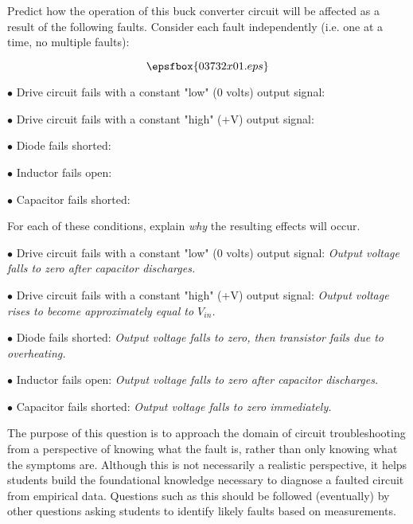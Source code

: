 

Predict how the operation of this buck converter circuit will be affected as a result of the following faults.  Consider each fault independently (i.e. one at a time, no multiple faults):

$$\epsfbox{03732x01.eps}$$

\medskip
\item{$\bullet$} Drive circuit fails with a constant "low" (0 volts) output signal:
\vskip 5pt
\item{$\bullet$} Drive circuit fails with a constant "high" (+V) output signal:
\vskip 5pt
\item{$\bullet$} Diode fails shorted:
\vskip 5pt
\item{$\bullet$} Inductor fails open:
\vskip 5pt
\item{$\bullet$} Capacitor fails shorted:
\medskip

For each of these conditions, explain {\it why} the resulting effects will occur.







\medskip
\item{$\bullet$} Drive circuit fails with a constant "low" (0 volts) output signal: {\it Output voltage falls to zero after capacitor discharges.}
\vskip 5pt
\item{$\bullet$} Drive circuit fails with a constant "high" (+V) output signal: {\it Output voltage rises to become approximately equal to $V_{in}$.}
\vskip 5pt
\item{$\bullet$} Diode fails shorted: {\it Output voltage falls to zero, then transistor fails due to overheating.}
\vskip 5pt
\item{$\bullet$} Inductor fails open: {\it Output voltage falls to zero after capacitor discharges.}
\vskip 5pt
\item{$\bullet$} Capacitor fails shorted: {\it Output voltage falls to zero immediately.}
\medskip







The purpose of this question is to approach the domain of circuit troubleshooting from a perspective of knowing what the fault is, rather than only knowing what the symptoms are.  Although this is not necessarily a realistic perspective, it helps students build the foundational knowledge necessary to diagnose a faulted circuit from empirical data.  Questions such as this should be followed (eventually) by other questions asking students to identify likely faults based on measurements.




